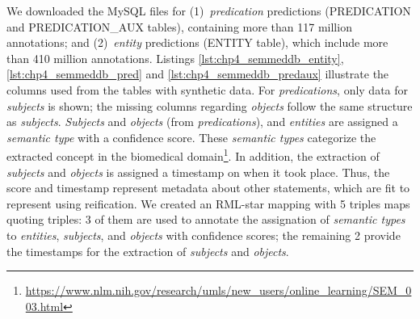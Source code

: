 We downloaded the MySQL files for (1)~\textit{predication} predictions (PREDICATION and PREDICATION\_AUX tables), containing more than 117 million annotations; and (2)~\textit{entity} predictions (ENTITY table), which include more than 410 million annotations.
Listings \ref{lst:chp4_semmeddb_entity}, \ref{lst:chp4_semmeddb_pred} and \ref{lst:chp4_semmeddb_predaux} illustrate the columns used from the tables with synthetic data. 
For \textit{predications}, only data for \textit{subjects} is shown; the missing columns regarding \textit{objects} follow the same structure as \textit{subjects}.
\textit{Subjects} and \textit{objects} (from \textit{predications}), and \textit{entities} are assigned a \textit{semantic type} with a confidence score.
These \textit{semantic types} categorize the extracted concept in the biomedical domain\footnote{\url{https://www.nlm.nih.gov/research/umls/new\_users/online\_learning/SEM\_003.html}}.
In addition, the extraction of \textit{subjects} and \textit{objects} is assigned a timestamp on when it took place. 
Thus, the score and timestamp represent metadata about other statements, which are fit to represent using reification.
We created an RML-star mapping with 5 triples maps quoting triples:
3 of them are used to annotate the assignation of \textit{semantic types} to \textit{entities}, \textit{subjects}, and \textit{objects} with confidence scores;
the remaining 2 provide the timestamps for the extraction of \textit{subjects} and \textit{objects}. 




